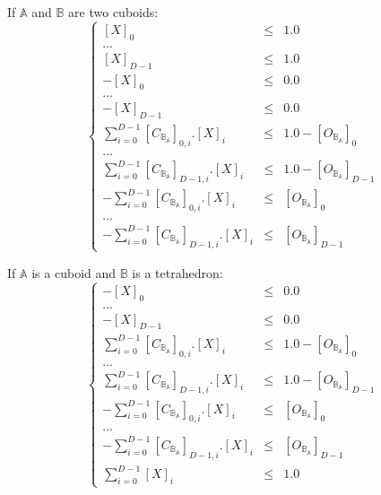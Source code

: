 \documentclass[12pt, a4paper]{article}
\begin{document}
If $\mathbb{A}$ and $\mathbb{B}$ are two cuboids:
\begin{equation}
\left\lbrace
\begin{array}{rcl}
\left[X\right]_0&\le&1.0\\
...\\
\left[X\right]_{D-1}&\le&1.0\\
-\left[X\right]_0&\le&0.0\\
...\\
-\left[X\right]_{D-1}&\le&0.0\\
\sum_{i=0}^{D-1}\left[C_{\mathbb{B}_\mathbb{A}}\right]_{0,i}.\left[X\right]_i&\le&1.0-\left[O_{\mathbb{B}_\mathbb{A}}\right]_0\\
...\\
\sum_{i=0}^{D-1}\left[C_{\mathbb{B}_\mathbb{A}}\right]_{D-1,i}.\left[X\right]_i&\le&1.0-\left[O_{\mathbb{B}_\mathbb{A}}\right]_{D-1}\\
-\sum_{i=0}^{D-1}\left[C_{\mathbb{B}_\mathbb{A}}\right]_{0,i}.\left[X\right]_i&\le&\left[O_{\mathbb{B}_\mathbb{A}}\right]_0\\
...\\
-\sum_{i=0}^{D-1}\left[C_{\mathbb{B}_\mathbb{A}}\right]_{D-1,i}.\left[X\right]_i&\le&\left[O_{\mathbb{B}_\mathbb{A}}\right]_{D-1}
\end{array}
\right.
\end{equation}

If $\mathbb{A}$ is a cuboid and $\mathbb{B}$ is a tetrahedron:
\begin{equation}
\left\lbrace
\begin{array}{rcl}
-\left[X\right]_0&\le&0.0\\
...\\
-\left[X\right]_{D-1}&\le&0.0\\
\sum_{i=0}^{D-1}\left[C_{\mathbb{B}_\mathbb{A}}\right]_{0,i}.\left[X\right]_i&\le&1.0-\left[O_{\mathbb{B}_\mathbb{A}}\right]_0\\
...\\
\sum_{i=0}^{D-1}\left[C_{\mathbb{B}_\mathbb{A}}\right]_{D-1,i}.\left[X\right]_i&\le&1.0-\left[O_{\mathbb{B}_\mathbb{A}}\right]_{D-1}\\
-\sum_{i=0}^{D-1}\left[C_{\mathbb{B}_\mathbb{A}}\right]_{0,i}.\left[X\right]_i&\le&\left[O_{\mathbb{B}_\mathbb{A}}\right]_0\\
...\\
-\sum_{i=0}^{D-1}\left[C_{\mathbb{B}_\mathbb{A}}\right]_{D-1,i}.\left[X\right]_i&\le&\left[O_{\mathbb{B}_\mathbb{A}}\right]_{D-1}\\
\sum_{i=0}^{D-1}\left[X\right]_i&\le&1.0
\end{array}
\right.
\end{equation}
\end{document}

